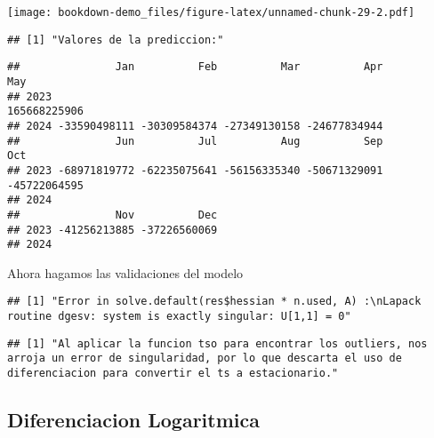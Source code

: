 \documentclass[
]{book}
\newenvironment{Shaded}{\begin{snugshade}}{\end{snugshade}}
\newcommand{\AttributeTok}[1]{\textcolor[rgb]{0.77,0.63,0.00}{#1}}
\newcommand{\CommentTok}[1]{\textcolor[rgb]{0.56,0.35,0.01}{\textit{#1}}}
\newcommand{\DecValTok}[1]{\textcolor[rgb]{0.00,0.00,0.81}{#1}}
\newcommand{\FunctionTok}[1]{\textcolor[rgb]{0.00,0.00,0.00}{#1}}
\newcommand{\NormalTok}[1]{#1}
\newcommand{\OtherTok}[1]{\textcolor[rgb]{0.56,0.35,0.01}{#1}}
\newcommand{\SpecialCharTok}[1]{\textcolor[rgb]{0.00,0.00,0.00}{#1}}
\begin{document}
\texttt{[image: bookdown-demo\_files/figure-latex/unnamed-chunk-29-2.pdf]}

\begin{verbatim}
## [1] "Valores de la prediccion:"
\end{verbatim}

\begin{verbatim}
##               Jan          Feb          Mar          Apr          May
## 2023                                                     165668225906
## 2024 -33590498111 -30309584374 -27349130158 -24677834944             
##               Jun          Jul          Aug          Sep          Oct
## 2023 -68971819772 -62235075641 -56156335340 -50671329091 -45722064595
## 2024                                                                 
##               Nov          Dec
## 2023 -41256213885 -37226560069
## 2024
\end{verbatim}

Ahora hagamos las validaciones del modelo

\begin{verbatim}
## [1] "Error in solve.default(res$hessian * n.used, A) :\nLapack routine dgesv: system is exactly singular: U[1,1] = 0"
\end{verbatim}

\begin{verbatim}
## [1] "Al aplicar la funcion tso para encontrar los outliers, nos arroja un error de singularidad, por lo que descarta el uso de diferenciacion para convertir el ts a estacionario."
\end{verbatim}

\hypertarget{diferenciacion-logaritmica}{%
\subsection{Diferenciacion Logaritmica}\label{diferenciacion-logaritmica}}

\begin{Shaded}
\end{Shaded}
\end{document}
